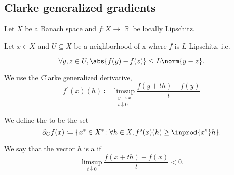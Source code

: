 \subsection{Clarke generalized gradients}\label{subsec:clarke_gradients}

Let \( X \) be a Banach space and \( f: X \to \BbbR \) be locally Lipschitz.

\begin{definition}\label{def:clarke_gradient}\mcite\cite[def. 10.3]{Clarke2013}
  Let \( x \in X \) and \( U \subseteq X \) be a neighborhood of x where \( f \) is \( L \)-Lipschitz, i.e.

  \begin{equation*}
    \forall y, z \in U, \abs{f(y) - f(z)} \leq L \norm{y - z}.
  \end{equation*}

  We use the Clarke generalized \hyperref[def:nonsmooth_derivatives/clarke]{derivative},
  \begin{equation*}
    f^\circ(x)(h) \coloneqq \limsup_{\substack{y \to x \\ t \downarrow 0}} \frac {f(y + th) - f(y)} t
  \end{equation*}

  We define the  to be the set
  \begin{equation*}
    \partial_C f(x) \coloneqq \{ x^* \in X^* \colon \forall h \in X, f^\circ(x)(h) \geq \inprod {x^*} h \}.
  \end{equation*}

  We say that the vector \( h \) is a  if
  \begin{equation*}
    \limsup_{t \downarrow 0} \frac {f(x + th) - f(x)} t < 0.
  \end{equation*}
\end{definition}

